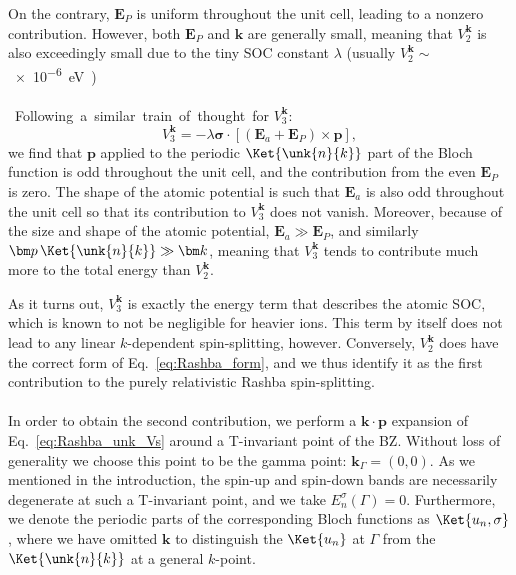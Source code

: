 On the contrary, $\bm E_P$ is uniform throughout the unit cell, leading to a nonzero contribution.
However, both $\bm E_P$ and $\bm k$ are generally small, meaning that $V^{\bm k}_2$ is also exceedingly small due to the tiny SOC constant $\lambda$ (usually $V^{\bm k}_2 \sim$ \SI{e-6}eV).
\\\\
Following a similar train of thought for $V^{\bm k}_3$:
\begin{equation}
	V^{\bm k}_3 = -\lambda \bm{\sigma} \cdot \left[ (\bm E_a + \bm E_P) \times \bm{p}\right],
\end{equation}
we find that $\bm p$ applied to the periodic $\Ket{\unk{n}{k}}$ part of the Bloch function is odd throughout the unit cell, and the contribution from the even $\bm E_P$ is zero.
The shape of the atomic potential is such that $\bm E_a$ is also odd throughout the unit cell so that its contribution to $V^{\bm k}_3$ does not vanish.
Moreover, because of the size and shape of the atomic potential, $\bm E_a \gg \bm E_P$, and similarly $\bm p\,\Ket{\unk{n}{k}} \gg \bm k$, meaning that $V^{\bm k}_3$ tends to contribute much more to the total energy than $V^{\bm k}_2$.

As it turns out, $V^{\bm k}_3$ is exactly the energy term that describes the atomic SOC, which is known to not be negligible for heavier ions.
This term by itself does not lead to any linear $k$-dependent spin-splitting, however.
Conversely, $V_2^{\bm k}$ does have the correct form of Eq.~\eqref{eq:Rashba_form}, and we thus identify it as the first contribution to the purely relativistic Rashba spin-splitting.
\\\\
In order to obtain the second contribution, we perform a $\bm k \cdot \bm p$ expansion of Eq.~\eqref{eq:Rashba_unk_Vs} around a T-invariant point of the BZ.
Without loss of generality we choose this point to be the gamma point: $\bm{k}_\Gamma = (0, 0)$.
As we mentioned in the introduction, the spin-up and spin-down bands are necessarily degenerate at such a T-invariant point, and we take $E^{\sigma}_n(\Gamma) = 0$.
Furthermore, we denote the periodic parts of the corresponding Bloch functions as $\Ket{u_n, \sigma}$, where we have omitted $\bm k$ to distinguish the $\Ket{u_n}$ at $\Gamma$ from the $\Ket{\unk{n}{k}}$ at a general $k$-point.

